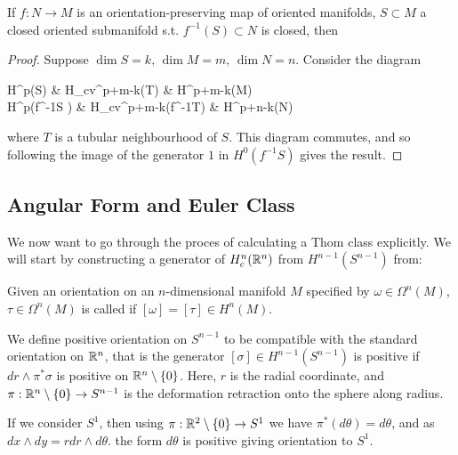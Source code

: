 \documentclass{article}
\begin{document}
\begin{prop}
	If $f:N \to M$ is an orientation-preserving map of oriented manifolds, $S \subset M$ a closed oriented submanifold s.t. $f^{-1}(S)\subset N$ is closed, then
\end{prop}
\begin{proof}
	Suppose $\dim S = k, \, \dim M = m, \, \dim N = n$. Consider the diagram 
	\begin{tkz}
		H^p(S) \arrow[r,"\mc{T}"] \arrow[d,"f^\ast"'] & H_{cv}^{p+m-k}(T) \arrow[r,"j_\ast"] \arrow[d,"f^\ast"'] & H^{p+m-k}(M) \arrow[d,"f^\ast"'] \\ 
		H^{p}(f^{-1}S ) \arrow[r,"\mc{T}"] & H_{cv}^{p+m-k}(f^{-1}T) \arrow[r,"j_\ast"] & H^{p+n-k}(N) 
	\end{tkz}
where $T$ is a tubular neighbourhood of $S$. This diagram commutes, and so following the image of the generator $1$ in $H^0(f^{-1}S)$ gives the result. 
\end{proof}

\subsection{Angular Form and Euler Class}
We now want to go through the proces of calculating a Thom class explicitly. We will start by constructing a generator of $H_c^n(\mathbb{R}^n)$ from $H^{n-1}(S^{n-1})$ from: 
\begin{definition}
	Given an orientation on an $n$-dimensional manifold $M$ specified by $\omega \in \Omega^n(M)$, $\tau \in \Omega^n(M)$ is called  if $[\omega] = [\tau] \in H^n(M)$. 
\end{definition} 
We define positive orientation on $S^{n-1}$ to be compatible with the standard orientation on $\mathbb{R}^n$, that is the generator $[\sigma]\in H^{n-1}(S^{n-1})$ is positive if $dr \wedge \pi^\ast \sigma$ is positive on $\mathbb{R}^n\setminus\left\{ 0 \right\}$. Here, $r$ is the radial coordinate, and $\pi:\mathbb{R}^n \setminus \left\{ 0 \right\} \to S^{n-1}$ is the deformation retraction onto the sphere along radius. 

\begin{example}
	If we consider $S^1$, then using $\pi:\mathbb{R}^2\setminus\left\{ 0 \right\} \to S^1$ we have $\pi^\ast (d\theta) = d\theta$, and as $dx \wedge dy = rdr \wedge d\theta$. the form $d\theta$ is positive giving orientation to $S^1$.
\end{example}
\end{document}
